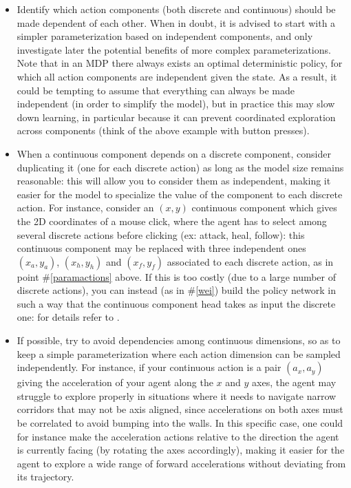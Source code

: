 \documentclass[letterpaper]{article} \usepackage{aaai20}  \usepackage{times}  \usepackage{helvet} \usepackage{courier}  \usepackage[hyphens]{url}  \usepackage{graphicx} \urlstyle{rm} \def\UrlFont{\rm}  \usepackage{graphicx}  \usepackage[section]{placeins}
\newcommand{\citet}{\cite}  \newcommand{\citep}{\cite} \DeclareMathOperator*{\softmax}{softmax}
\begin{document}
\begin{itemize}
    \item Identify which action components (both discrete and continuous) should be made dependent of each other.
    When in doubt, it is advised to start with a simpler parameterization based on independent components, and only investigate later the potential benefits of more complex parameterizations.
    Note that in an MDP there always exists an optimal deterministic policy, for which all action components are independent given the state.
    As a result, it could be tempting to assume that everything can always be made independent (in order to simplify the model), but in practice this may slow down learning, in particular because it can prevent coordinated exploration across components (think of the above example with button presses).
    
    \item When a continuous component depends on a discrete component, consider duplicating it (one for each discrete action) as long as the model size remains reasonable: this will allow you to consider them as independent, making it easier for the model to specialize the value of the component to each discrete action.
    For instance, consider an $(x, y)$ continuous component which gives the 2D coordinates of a mouse click, where the agent has to select among several discrete actions before clicking (ex: attack, heal, follow): this continuous component may be replaced with three independent ones $(x_a, y_a)$, $(x_h, y_h)$ and $(x_f, y_f)$ associated to each discrete action, as in point \#\ref{paramactions} above.
    If this is too costly (due to a large number of discrete actions), you can instead (as in \#\ref{wei}) build the policy network in such a way that the continuous component head takes as input the discrete one: for details refer to \citet{wei2018}.
    
    \item If possible, try to avoid dependencies among continuous dimensions, so as to keep a simple parameterization where each action dimension can be sampled independently.
    For instance, if your continuous action is a pair $(a_x, a_y)$ giving the acceleration of your agent along the $x$ and $y$ axes, the agent may struggle to explore properly in situations where it needs to navigate narrow corridors that may not be axis aligned, since accelerations on both axes must be correlated to avoid bumping into the walls.
    In this specific case, one could for instance make the acceleration actions relative to the direction the agent is currently facing (by rotating the axes accordingly), making it easier for the agent to explore a wide range of forward accelerations without deviating from its trajectory.
    
\end{itemize}
\end{document}
